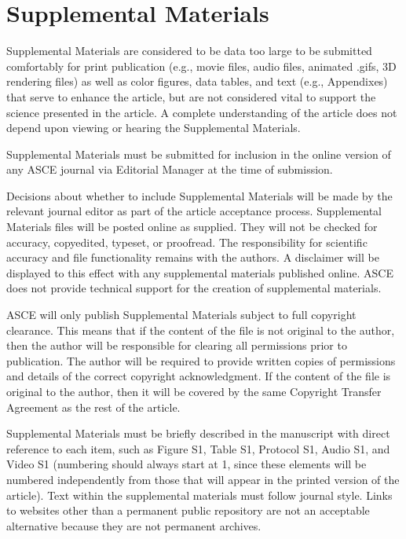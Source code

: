 \documentclass[Journal,letterpaper]{ascelike-new}
\begin{document}
\section{Supplemental Materials}

Supplemental Materials are considered to be data too large to be submitted comfortably for print publication (e.g., movie files, audio files, animated .gifs, 3D rendering files) as well as color figures, data tables, and text (e.g., Appendixes) that serve to enhance the article, but are not considered vital to support the science presented in the article. A complete understanding of the article does not depend upon viewing or hearing the Supplemental Materials.

Supplemental Materials must be submitted for inclusion in the online version of any ASCE journal via Editorial Manager at the time of submission.

Decisions about whether to include Supplemental Materials will be made by the relevant journal editor as part of the article acceptance process. Supplemental Materials files will be posted online as supplied. They will not be checked for accuracy, copyedited, typeset, or proofread. The responsibility for scientific accuracy and file functionality remains with the authors. A disclaimer will be displayed to this effect with any supplemental materials published online. ASCE does not provide technical support for the creation of supplemental materials.

ASCE will only publish Supplemental Materials subject to full copyright clearance. This means that if the content of the file is not original to the author, then the author will be responsible for clearing all permissions prior to publication. The author will be required to provide written copies of permissions and details of the correct copyright acknowledgment. If the content of the file is original to the author, then it will be covered by the same Copyright Transfer Agreement as the rest of the article.

Supplemental Materials must be briefly described in the manuscript with direct reference to each item, such as Figure S1, Table S1, Protocol S1, Audio S1, and Video S1 (numbering should always start at 1, since these elements will be numbered independently from those that will appear in the printed version of the article). Text within the supplemental materials must follow journal style. Links to websites other than a permanent public repository are not an acceptable alternative because they are not permanent archives.
\end{document}
